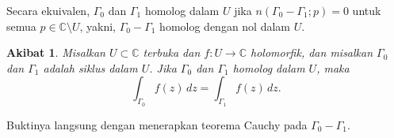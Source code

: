 \documentclass[12pt,openany]{book}
\newcommand{\C}{{\mathbb{C}}}
\theoremstyle{plain}
\newtheorem{cor}[thm]{Akibat}
\theoremstyle{remark}
\theoremstyle{definition}
\theoremstyle{exercise}
\theoremstyle{example}
\begin{document}
Secara ekuivalen, $\Gamma_0$ dan $\Gamma_1$ homolog dalam $U$ jika
$n(\Gamma_0 - \Gamma_1;p) = 0$ untuk semua $p \in \C \setminus U$,
yakni, $\Gamma_0-\Gamma_1$ homolog dengan nol dalam $U$.

\begin{cor} \label{cor:homologoussameint}
Misalkan $U \subset \C$ terbuka dan $f \colon U \to \C$ holomorfik,
dan misalkan
$\Gamma_0$ dan $\Gamma_1$ adalah siklus dalam $U$.
Jika 
$\Gamma_0$ dan $\Gamma_1$
homolog dalam $U$, maka
\begin{equation*}
\int_{\Gamma_0} f(z)\, dz = 
\int_{\Gamma_1} f(z)\, dz .
\end{equation*}
\end{cor}

Buktinya langsung dengan menerapkan teorema Cauchy pada $\Gamma_0-\Gamma_1$.
\end{document}
